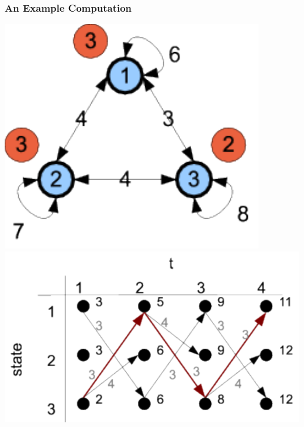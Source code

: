 \documentclass{beamer}
\begin{document}

\begin{frame} \frametitle{An Example Computation}

  \includegraphics[scale=.6]{viterbi1}\\[-2\baselineskip]
  \hfill\includegraphics[scale=.6]{viterbi2}
  
\end{frame}
\end{document}
